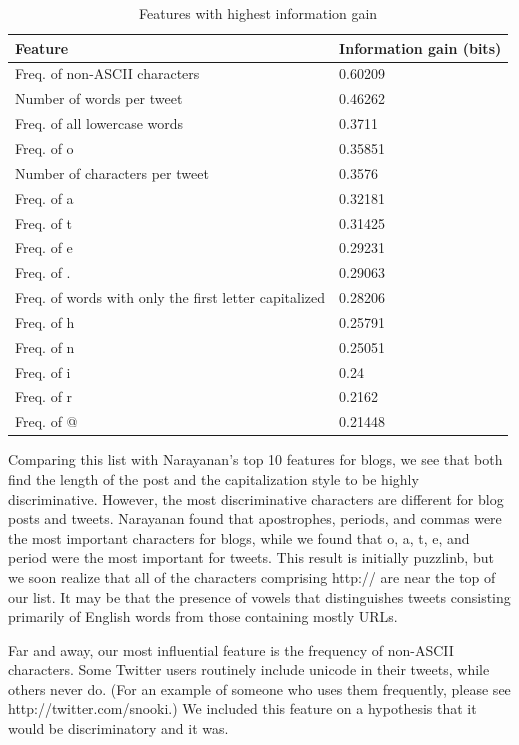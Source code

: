 \documentclass[10pt, conference, compsocconf]{IEEEtran}
\begin{document}
\begin{table}[h]
  \centering
  \begin{tabular}{ll}
    \toprule
    \bf{Feature} & \bf{Information gain (bits)} \\ \midrule
    Freq. of non-ASCII characters & 0.60209 \\ \midrule
    Number of words per tweet & 0.46262 \\ \midrule
    Freq. of all lowercase words & 0.3711 \\ \midrule
    Freq. of o & 0.35851 \\ \midrule
    Number of characters per tweet & 0.3576 \\ \midrule
    Freq. of a & 0.32181 \\ \midrule
    Freq. of t & 0.31425 \\ \midrule
    Freq. of e & 0.29231 \\ \midrule
    Freq. of . & 0.29063 \\ \midrule
    Freq. of words with only the first letter capitalized & 0.28206 \\ \midrule
    Freq. of h & 0.25791 \\ \midrule
    Freq. of n & 0.25051 \\ \midrule
    Freq. of i & 0.24 \\ \midrule
    Freq. of r & 0.2162 \\ \midrule
    Freq. of @ & 0.21448 \\
    \bottomrule
  \end{tabular}
  \caption{Features with highest information gain}
\end{table}

Comparing this list with Narayanan's top 10 features for blogs, we see
that both find the length of the post and the capitalization style to
be highly discriminative. However, the most discriminative characters
are different for blog posts and tweets. Narayanan found that
apostrophes, periods, and commas were the most important characters
for blogs, while we found that o, a, t, e, and period were the most
important for tweets. This result is initially puzzlinb, but we
soon realize that all of the characters comprising http:// are near
the top of our list. It may be that the presence of vowels that
distinguishes tweets consisting primarily of English words from those
containing mostly URLs.

Far and away, our most influential feature is the frequency of
non-ASCII characters. Some Twitter users routinely include unicode in
their tweets, while others never do. (For an example of someone who
uses them frequently, please see http://twitter.com/snooki.) We
included this feature on a hypothesis that it would be discriminatory and
it was.
\end{document}
